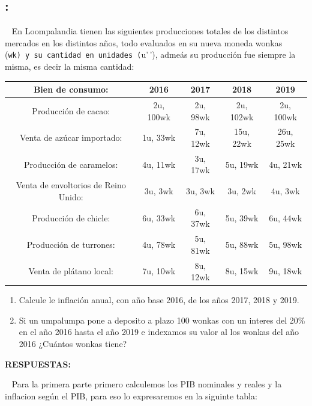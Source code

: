 \documentclass[
  letterpaper,
  DIV=11,
  numbers=noendperiod]{scrreport}
\providecommand{\tightlist}{%
  \setlength{\itemsep}{0pt}\setlength{\parskip}{0pt}}\usepackage{longtable,booktabs,array}
\begin{document}
\hypertarget{section-41}{%
\subsection{:}\label{section-41}}

~ En Loompalandia tienen las siguientes producciones totales de los
distintos mercados en los distintos años, todo evaluados en su nueva
moneda wonkas
(\texttt{wk\textquotesingle{}\textquotesingle{})\ y\ su\ cantidad\ en\ unidades\ (}u'\,'),
admeás su producción fue siempre la misma, es decir la misma cantidad:

\begin{table}[h]
    \centering
    \begin{tabular}{|c|c|c|c|c|}
        \hline
        Bien de consumo: & 2016 & 2017 & 2018 & 2019 \\\hline
        Producción de cacao: & 2u, 100wk & 2u, 98wk & 2u, 102wk & 2u, 100wk \\\hline
        Venta de azúcar importado: & 1u, 33wk & 7u, 12wk & 15u, 22wk & 26u, 25wk\\\hline
        Producción de caramelos: & 4u, 11wk & 3u, 17wk & 5u, 19wk & 4u, 21wk\\\hline
        Venta de envoltorios de Reino Unido: & 3u, 3wk & 3u, 3wk & 3u, 2wk & 4u, 3wk\\\hline
        Producción de chicle: & 6u, 33wk & 6u, 37wk & 5u, 39wk & 6u, 44wk\\\hline
        Producción de turrones: & 4u, 78wk & 5u, 81wk & 5u, 88wk & 5u, 98wk\\\hline
        Venta de plátano local: & 7u, 10wk & 8u, 12wk & 8u, 15wk & 9u, 18wk\\\hline
    \end{tabular}
\end{table}

\begin{enumerate}
\def\labelenumi{\arabic{enumi})}
\tightlist
\item
  Calcule le inflación anual, con año base 2016, de los años 2017, 2018
  y 2019.
\item
  Si un umpalumpa pone a deposito a plazo 100 wonkas con un interes del
  20\% en el año 2016 hasta el año 2019 e indexamos su valor al los
  wonkas del año 2016 ¿Cuántos wonkas tiene?
\end{enumerate}

\textbf{RESPUESTAS:}

~ Para la primera parte primero calculemos los PIB nominales y reales y
la inflacion según el PIB, para eso lo expresaremos en la siguinte
tabla:
\end{document}
